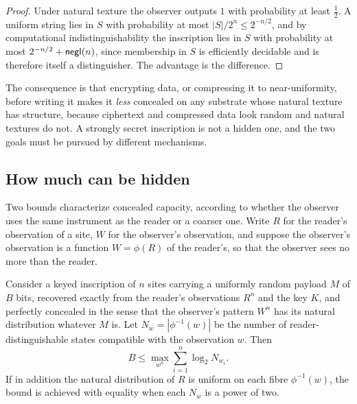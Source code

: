\begin{proof}
Under natural texture the observer outputs $1$ with probability at least $\tfrac12$. A uniform string lies in $S$ with probability at most $|S|/2^n\le2^{-n/2}$, and by computational indistinguishability the inscription lies in $S$ with probability at most $2^{-n/2}+\mathsf{negl}(n)$, since membership in $S$ is efficiently decidable and is therefore itself a distinguisher. The advantage is the difference.
\end{proof}

The consequence is that encrypting data, or compressing it to near-uniformity, before writing it makes it \emph{less} concealed on any substrate whose natural texture has structure, because ciphertext and compressed data look random and natural textures do not. A strongly secret inscription is not a hidden one, and the two goals must be pursued by different mechanisms.

\subsection{How much can be hidden}

Two bounds characterize concealed capacity, according to whether the observer uses the same instrument as the reader or a coarser one. Write $R$ for the reader's observation of a site, $W$ for the observer's observation, and suppose the observer's observation is a function $W=\phi(R)$ of the reader's, so that the observer sees no more than the reader.

\begin{proposition}\label{prop:fiber}
Consider a keyed inscription of $n$ sites carrying a uniformly random payload $M$ of $B$ bits, recovered exactly from the reader's observations $R^{n}$ and the key $K$, and perfectly concealed in the sense that the observer's pattern $W^{n}$ has its natural distribution whatever $M$ is. Let $N_w=|\phi^{-1}(w)|$ be the number of reader-distinguishable states compatible with the observation $w$. Then
\[
B\le\max_{w^{n}}\sum_{i=1}^{n}\log_2 N_{w_i}.
\]
If in addition the natural distribution of $R$ is uniform on each fibre $\phi^{-1}(w)$, the bound is achieved with equality when each $N_w$ is a power of two.
\end{proposition}

